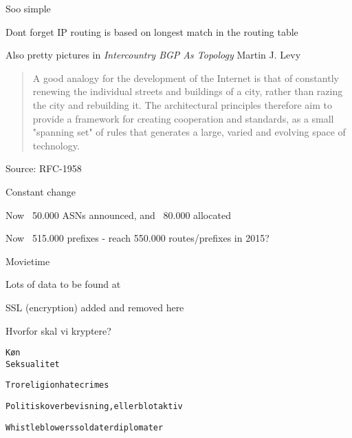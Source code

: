 \documentclass[20pt,landscape,a4paper,footrule]{foils}
\begin{document}


\centerline{Soo simple \smiley}

Dont forget IP routing is based on longest match in the routing table



Also pretty pictures in \emph{Intercountry BGP As Topology} Martin J. Levy\\




\begin{quote}
 A good analogy for the development of the Internet is that of
 constantly renewing the individual streets and buildings of a city,
 rather than razing the city and rebuilding it. The architectural
 principles therefore aim to provide a framework for creating
 cooperation and standards, as a small "spanning set" of rules that
 generates a large, varied and evolving space of technology.
\end{quote}
Source: RFC-1958

\begin{list2}
\item Constant change
\item Now ~50.000 ASNs announced, and ~80.000 allocated
\item Now ~515.000 prefixes - reach 550.000 routes/prefixes in 2015?
\end{list2}

Movietime

\centerline{Lots of data to be found at }


\centerline{SSL (encryption) added and removed here}




Hvorfor skal vi kryptere?

\begin{alltt}
       Køn
                       Seksualitet

 Tro religion       hatecrimes

 Politisk overbevisning, eller blot aktiv

 Whistleblowers             soldater      diplomater

\end{alltt}
\end{document}
